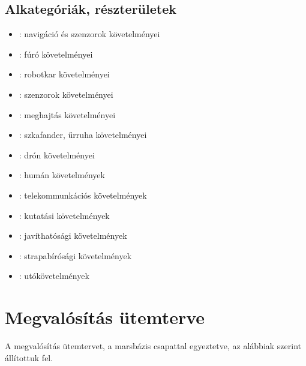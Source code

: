 \documentclass[12pt]{report}
\begin{document}
\subsection{Alkategóriák, részterületek}
\begin{itemize}
  \item {}: navigáció és szenzorok követelményei 
  \item {}: fúró követelményei
  \item {}: robotkar követelményei
  \item {}: szenzorok követelményei
  \item {}: meghajtás követelményei
  \item {}: szkafander, űrruha követelményei
  \item {}: drón követelményei
  \item {}: humán követelmények
  \item {}: telekommunkációs követelmények
  \item {}: kutatási követelmények
  \item {}: javíthatósági követelmények
  \item {}: strapabírósági követelmények
  \item {}: utókövetelmények
\end{itemize}




\section{Megvalósítás ütemterve}

A megvalósítás ütemtervet, a marsbázis csapattal egyeztetve, az alábbiak szerint állítottuk fel.
\end{document}
